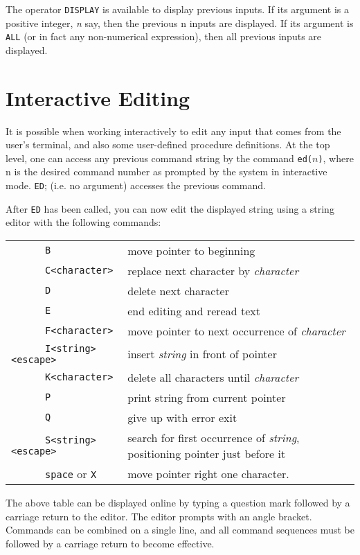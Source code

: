 The operator {\tt DISPLAY} is available to display previous
inputs.  If its argument is a positive integer, {\it n} say, then the
previous n inputs are displayed.  If its argument is {\tt ALL} (or in fact
any non-numerical expression), then all previous inputs are displayed.

\section{Interactive Editing}
It is possible when working interactively to edit any {\REDUCE} input that
comes from the user's terminal, and also some user-defined procedure
definitions.  At the top level, one can access any previous command string
by the command {\tt ed(}$n${\tt )}, where n is the desired
command number as prompted by the system in interactive mode. {\tt ED};
(i.e. no argument) accesses the previous command.

After {\tt ED} has been called, you can now edit the displayed string using a
string editor with the following commands:

\begin{tabular}{lp{\rboxwidth}}
{\tt~~~~~  B} & move pointer to beginning \\
{\tt~~~~~  C<character>} & replace next character by
{\em character} \\
{\tt~~~~~  D} & delete next character \\
{\tt~~~~~  E} & end editing and reread text \\
{\tt~~~~~  F<character>} & move pointer to next
occurrence of {\em character} \\[1.7pt]
{\tt~~~~~  I<string><escape>} &
 insert {\em string\/} in front of pointer \\
{\tt~~~~~  K<character>} & delete all characters
 until {\em character} \\
{\tt~~~~~  P} & print string from current pointer \\
{\tt~~~~~  Q} & give up with error exit \\
{\tt~~~~~  S<string><escape>} &
 search for first occurrence of {\em string},
                             positioning pointer just before it \\
{\tt~~~~~  space} or {\tt X} & move pointer right
one character.
\end{tabular}

The above table can be displayed online by typing a question mark followed
by a carriage return to the editor. The editor prompts with an angle
bracket. Commands can be combined on a single line, and all command
sequences must be followed by a carriage return to become effective.

